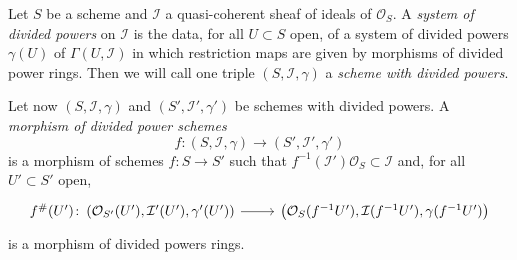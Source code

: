 \begin{defn}\label{defn:DividedPowersSheaf}
	Let $S$ be a scheme and $\mathcal{I}$ a quasi-coherent sheaf
	of ideals of $\mathcal{O}_{ S }$.
	A {\em system of divided powers} on $\mathcal{I}$ is the data,
	for all $U \subset S$ open, of a system of divided powers $\gamma(U)$ 
	of $\Gamma(U,\mathcal{I})$ in which restriction maps
	are given by morphisms of divided power rings.
	Then we will call one triple $\left(S, \mathcal{I}, \gamma\right)$
	a {\em scheme with divided powers}.

	Let now $\left(S, \mathcal{I}, \gamma\right)$ and $\left(S', \mathcal{I}', \gamma'\right)$
	be schemes with divided powers.
	A {\em morphism of divided power schemes}
	\begin{equation*}
	f\colon \left(S, \mathcal{I}, \gamma\right) \to 
	\left(S', \mathcal{I}', \gamma'\right)
	\end{equation*}
	is a morphism of schemes
	$f\colon S \to S'$ such that
	$f^{-1}(\mathcal{I}') \mathcal{O}_S \subset \mathcal{I}$
	and, for all $U' \subset S'$ open,
	\begin{equation*}
	\begin{tikzcd}[row sep = 0ex
		,/tikz/column 1/.append style={anchor=base east}
		,/tikz/column 2/.append style={anchor=base west}]
		f^\#(U')\colon 
		\left(\mathcal{O}_{S'}(U'), \mathcal{I}'(U'), \gamma'(U')\right)
		\arrow[r, "", rightarrow] &
		\left(\mathcal{O}_{ S }(f^{-1}U'), \mathcal{I}(f^{-1}U'), \gamma(f^{-1}U')\right)
	\end{tikzcd}
	\end{equation*} 
	is a morphism of divided powers rings.
\end{defn}


